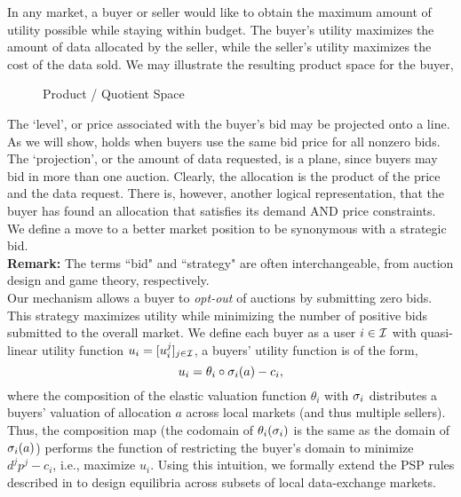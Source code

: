 In any market, a buyer or seller would like to obtain the maximum amount of utility 
possible while staying within budget. The buyer's utility maximizes the amount of 
data allocated by the seller, while the seller's utility maximizes the cost of the 
data sold.
We may illustrate the resulting product space for the buyer,
\vspace{-0.3in}
{
\begin{center}\begin{figure}[H]\caption{Product / Quotient Space}
\end{figure}\end{center}
}
\vspace{-0.3in}
The `level', or price associated with the buyer's bid may be projected onto a line. As we 
will show, holds when buyers use the same bid price for all nonzero bids. The `projection',
or the amount of data requested, is a plane, since buyers may bid in more than
one auction. Clearly, the allocation is the product of the price and the data request.
There is, however, another logical representation, that the buyer has found an allocation that
satisfies its demand AND price constraints.
We define a move to a better market position to be synonymous with a
strategic bid. \\ 
\textbf{Remark:} The terms ``bid" and ``strategy" are often interchangeable,
from auction design and game theory, respectively.\\
Our mechanism allows a buyer
to \emph{opt-out} of auctions by submitting zero bids. This strategy maximizes
utility while minimizing the number of positive bids submitted to the overall
market.
We define each buyer as a user $i\in\mathcal{I}$ with quasi-linear utility
function $u_i = [u_i^j]_{j\in\mathcal{I}}$, a buyers' utility function is of the form,
\begin{equation}\label{buyerutility}
    u_i = \theta_i \circ \sigma_i(a) - c_i,
\end{equation}
where the composition of the elastic valuation function $\theta_i$ with $\sigma_i$
distributes a buyers' valuation of allocation $a$ across local markets (and thus
multiple sellers). Thus, the composition map (the codomain of $\theta_i(\sigma_i)$ is the
same as the domain of $\sigma_i(a)$) performs the function of restricting
the buyer's domain to minimize $d^j p^j - c_i$, i.e., maximize $u_i$.
Using this intuition, we formally extend the PSP rules described
in \cite{semret} to design equilibria across subsets of local data-exchange markets.

